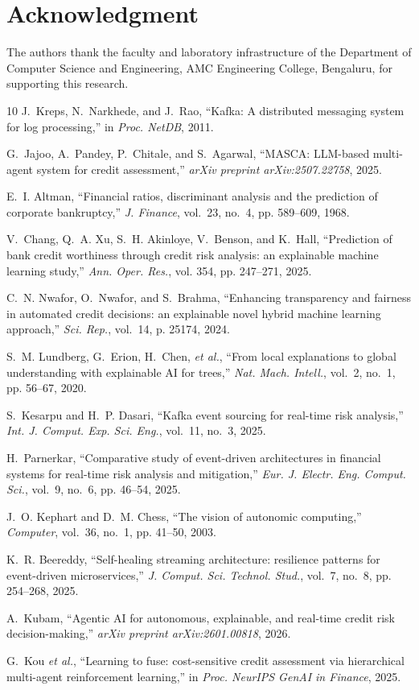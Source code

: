 \documentclass[conference]{IEEEtran}
\begin{document}
\section*{Acknowledgment}
The authors thank the faculty and laboratory infrastructure of the Department of Computer Science and Engineering, AMC Engineering College, Bengaluru, for supporting this research.

\begin{thebibliography}{10}
J.~Kreps, N.~Narkhede, and J.~Rao, ``Kafka: A distributed messaging system for log processing,'' in \emph{Proc. NetDB}, 2011.

G.~Jajoo, A.~Pandey, P.~Chitale, and S.~Agarwal, ``MASCA: LLM-based multi-agent system for credit assessment,'' \emph{arXiv preprint arXiv:2507.22758}, 2025.

E.~I. Altman, ``Financial ratios, discriminant analysis and the prediction of corporate bankruptcy,'' \emph{J. Finance}, vol.~23, no.~4, pp. 589--609, 1968.

V.~Chang, Q.~A. Xu, S.~H. Akinloye, V.~Benson, and K.~Hall, ``Prediction of bank credit worthiness through credit risk analysis: an explainable machine learning study,'' \emph{Ann. Oper. Res.}, vol. 354, pp. 247--271, 2025.

C.~N. Nwafor, O.~Nwafor, and S.~Brahma, ``Enhancing transparency and fairness in automated credit decisions: an explainable novel hybrid machine learning approach,'' \emph{Sci. Rep.}, vol.~14, p. 25174, 2024.

S.~M. Lundberg, G.~Erion, H.~Chen, \emph{et al.}, ``From local explanations to global understanding with explainable AI for trees,'' \emph{Nat. Mach. Intell.}, vol.~2, no.~1, pp. 56--67, 2020.

S.~Kesarpu and H.~P. Dasari, ``Kafka event sourcing for real-time risk analysis,'' \emph{Int. J. Comput. Exp. Sci. Eng.}, vol.~11, no.~3, 2025.

H.~Parnerkar, ``Comparative study of event-driven architectures in financial systems for real-time risk analysis and mitigation,'' \emph{Eur. J. Electr. Eng. Comput. Sci.}, vol.~9, no.~6, pp. 46--54, 2025.

J.~O. Kephart and D.~M. Chess, ``The vision of autonomic computing,'' \emph{Computer}, vol.~36, no.~1, pp. 41--50, 2003.

K.~R. Beereddy, ``Self-healing streaming architecture: resilience patterns for event-driven microservices,'' \emph{J. Comput. Sci. Technol. Stud.}, vol.~7, no.~8, pp. 254--268, 2025.

A.~Kubam, ``Agentic AI for autonomous, explainable, and real-time credit risk decision-making,'' \emph{arXiv preprint arXiv:2601.00818}, 2026.

G.~Kou \emph{et al.}, ``Learning to fuse: cost-sensitive credit assessment via hierarchical multi-agent reinforcement learning,'' in \emph{Proc. NeurIPS GenAI in Finance}, 2025.
\end{thebibliography}
\end{document}
